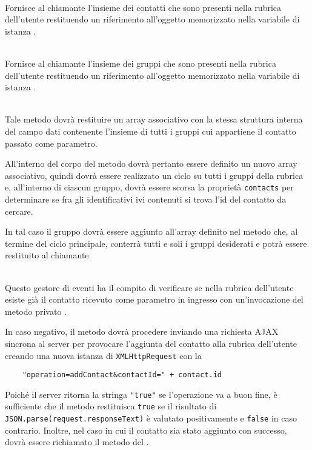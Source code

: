\begin{description}
\item{}\\
Fornisce al chiamante l'insieme dei contatti che sono presenti nella rubrica dell'utente restituendo un riferimento all'oggetto memorizzato nella variabile di istanza .

\item{}\\
Fornisce al chiamante l'insieme dei gruppi che sono presenti nella rubrica dell'utente restituendo un riferimento all'oggetto memorizzato nella variabile di istanza .

\item{}\\
Tale metodo dovrà restituire un array associativo con la stessa struttura interna del campo dati  contenente l'insieme di tutti i gruppi cui appartiene il contatto passato come parametro.

All'interno del corpo del metodo dovrà pertanto essere definito un nuovo array associativo, quindi dovrà essere realizzato un ciclo su tutti i gruppi della rubrica e, all'interno di ciascun gruppo, dovrà essere scorsa la proprietà \verb'contacts' per determinare se fra gli identificativi ivi contenuti si trova l'id del contatto da cercare.

In tal caso il gruppo dovrà essere aggiunto all'array definito nel metodo che, al termine del ciclo principale, conterrà tutti e soli i gruppi desiderati e potrà essere restituito al chiamante.

\item{}\\
Questo gestore di eventi ha il compito di verificare se nella rubrica dell'utente esiste già il contatto ricevuto come parametro in ingresso con un'invocazione del metodo privato . 

In caso negativo, il metodo dovrà procedere inviando una richiesta AJAX sincrona al server per provocare l'aggiunta del contatto alla rubrica dell'utente creando una nuova istanza di \verb'XMLHttpRequest' con la 
\begin{verbatim}
    "operation=addContact&contactId=" + contact.id
\end{verbatim}

Poiché il server ritorna la stringa \verb'"true"' se l'operazione va a buon fine, è sufficiente che il metodo restituisca \verb'true' se il risultato di \verb'JSON.parse(request.responseText)' è valutato positivamente e \verb'false' in caso contrario. Inoltre, nel caso in cui il contatto sia stato aggiunto con successo, dovrà essere richiamato il metodo  del .


\end{description}
